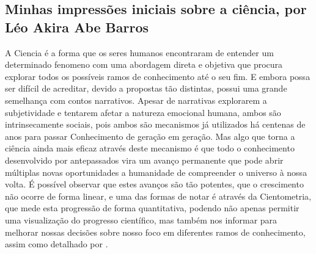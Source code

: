 \subsection{Minhas impressões iniciais sobre a ciência, por Léo Akira Abe Barros}

A \gls{Ciencia} é a forma que os seres humanos encontraram de entender um determinado \gls{fenomeno} com uma abordagem direta e objetiva que procura explorar todos os possíveis ramos de conhecimento até o seu fim. E embora possa ser difícil de acreditar, devido a propostas tão distintas, possui uma grande semelhança com contos narrativos.
Apesar de narrativas explorarem a subjetividade e tentarem afetar a natureza emocional humana, ambos são intrinsecamente sociais, pois ambos são mecanismos já utilizados há centenas de anos para passar \gls{Conhecimento} de geração em geração.
Mas algo que torna a ciência ainda mais eficaz através deste mecanismo é que todo o conhecimento desenvolvido por antepassados vira um avanço permanente que pode abrir múltiplas novas oportunidades a humanidade de compreender o universo à nossa volta.
É possível observar que estes avanços são tão potentes, que o crescimento não ocorre de forma linear, e uma das formas de notar é através da \gls{Cientometria}, que mede esta progressão de forma quantitativa, podendo não apenas permitir uma visualização do progresso científico, mas também nos informar para melhorar nossas decisões sobre nosso foco em diferentes ramos de conhecimento, assim como detalhado por \cite{dasilva_cientometria_2001}.